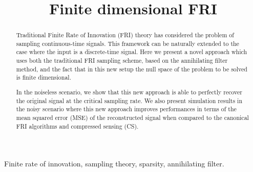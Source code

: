 \documentclass{article}
\begin{document}


\title{Finite dimensional FRI}

\address{$^\dagger$ Communications and Signal Processing Group (CSP),
Imperial College London, UK\\
\normalsize \texttt{\{ jon.onativia, p.dragotti \} @imperial.ac.uk}\\ \\
$^\star$ Signals, Information, and Networks Group (SING), Harvard University, USA\\
\normalsize \texttt{yuelu@seas.harvard.edu}
}

\maketitle




\begin{abstract}
Traditional Finite Rate of Innovation (FRI) theory has considered the problem of sampling 
continuous-time signals. This framework can be naturally extended
to the case where the input is a discrete-time signal. Here we present a novel approach 
which uses both the traditional FRI sampling scheme, based on the annihilating filter method, 
and the fact that in this new setup the null space of the problem to be 
solved is finite dimensional. 

In the noiseless scenario, we show that this new approach is able to perfectly recover the 
original signal at the critical sampling rate. We also present simulation results in the noisy scenario
where this new approach improves performances in terms of the mean squared error (MSE) of the 
reconstructed signal when compared to the canonical FRI algorithms and compressed sensing (CS).
\end{abstract}

\begin{keywords}
Finite rate of innovation, sampling theory, sparsity,
annihilating filter.
\end{keywords}




\end{document}
